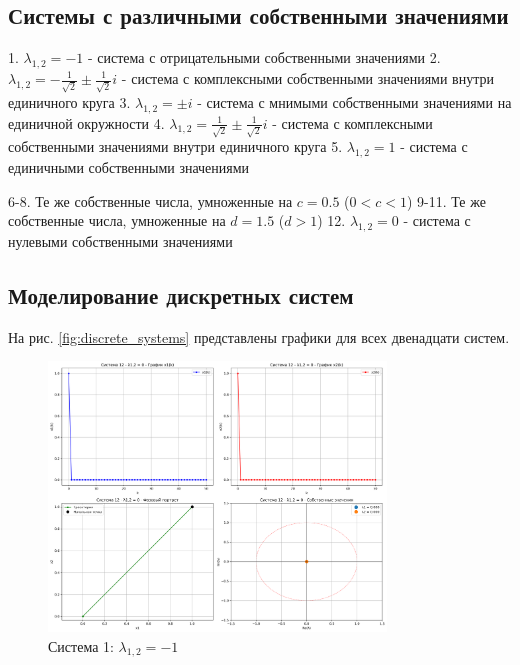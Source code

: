 \subsection{Системы с различными собственными значениями}

1. $\lambda_{1,2} = -1$ - система с отрицательными собственными значениями
2. $\lambda_{1,2} = -\frac{1}{\sqrt{2}} \pm \frac{1}{\sqrt{2}}i$ - система с комплексными собственными значениями внутри единичного круга
3. $\lambda_{1,2} = \pm i$ - система с мнимыми собственными значениями на единичной окружности
4. $\lambda_{1,2} = \frac{1}{\sqrt{2}} \pm \frac{1}{\sqrt{2}}i$ - система с комплексными собственными значениями внутри единичного круга
5. $\lambda_{1,2} = 1$ - система с единичными собственными значениями

6-8. Те же собственные числа, умноженные на $c = 0.5$ ($0 < c < 1$)
9-11. Те же собственные числа, умноженные на $d = 1.5$ ($d > 1$)
12. $\lambda_{1,2} = 0$ - система с нулевыми собственными значениями

\subsection{Моделирование дискретных систем}

На рис. \ref{fig:discrete_systems} представлены графики для всех двенадцати систем.

\begin{figure}[h!]
\centering
\includegraphics[width=0.8\textwidth]{images/task2/system_1_lambda_minus_1.png}
\caption{Система 1: $\lambda_{1,2} = -1$}
\label{fig:discrete1}
\end{figure}

